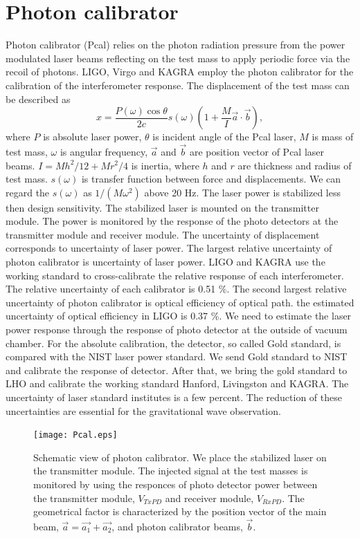 \documentclass[A4]{spie}  %
\begin{document}
\section{Photon calibrator} \label{sec:Pcal}
Photon calibrator (Pcal) relies on the photon radiation pressure from the power modulated laser beams reflecting on the test mass to apply periodic force via the recoil of photons. 
LIGO, Virgo and KAGRA employ the photon calibrator for the calibration of the interferometer response. The displacement of the test mass can be described as
\begin{equation}
 x = \frac{P(\omega) \cos{\theta}}{2c} s(\omega)\left(1+\frac{M}{I}\vec{a} \cdot \vec{b} \right) , \label{pcal}
\end{equation}
where $P$ is absolute laser power, $\theta$ is incident angle of the Pcal laser, $M$ is mass of test mass, $\omega$ is angular frequency, $\vec{a}$ and $\vec{b}$ are position vector of Pcal laser beams. $I=Mh^2/12+Mr^2/4$ is inertia, where $h$ and  $r$ are thickness and radius of test mass. $s(\omega)$ is transfer function between force and displacements. We can regard the $s(\omega)$ as $1/(M \omega^2)$ above 20 Hz. The laser power is stabilized less then design sensitivity. The stabilized laser is mounted on the transmitter module. The power is monitored by the response of the photo detectors at the transmitter module and receiver module.  The uncertainty of displacement corresponds to uncertainty of laser power. 
The largest relative uncertainty of photon calibrator is uncertainty of laser power.
LIGO and KAGRA use the working standard to cross-calibrate the relative response of each interferometer. The relative uncertainty of  each  calibrator is 0.51 \%. 
The second largest relative uncertainty of photon calibrator is optical efficiency of optical path. the estimated uncertainty of optical efficiency in LIGO is 0.37 \%. We need to estimate the laser power response through the response of photo detector at the outside of vacuum chamber. 
For the absolute calibration, the detector, so called Gold standard, is compared with the NIST laser power standard. We send Gold standard to NIST and calibrate the response of detector. After that, we bring the gold standard to LHO and calibrate the working standard Hanford, Livingston and KAGRA. The uncertainty of laser standard institutes is a few percent. 
The reduction of these uncertainties are essential for the gravitational wave observation.

\begin{figure}
\begin{center}
\texttt{[image: Pcal.eps]}
\caption{Schematic view of photon calibrator. We place the stabilized laser on the transmitter module. The injected signal at the test masses is monitored by using the responces of photo detector power between the transmitter module, $V_{TxPD}$ and  receiver module, $V_{RxPD}$.  The geometrical factor is characterized by the position vector of the main beam, $\vec{a}=\vec{a_1}+\vec{a_2}$, and photon calibrator beams, $\vec{b}$.}
\label{fig:Pcal}
\end{center}
\end{figure}
\end{document}
